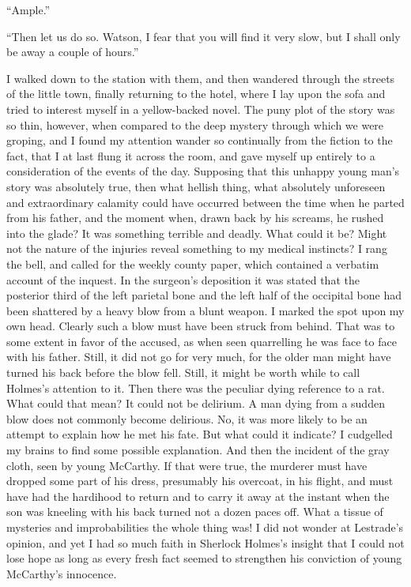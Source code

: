 “Ample.”

“Then let us do so. Watson, I fear that you will find it
very slow, but I shall only be away a couple of hours.”

I walked down to the station with them, and then wandered
through the streets of the little town, finally returning to the
hotel, where I lay upon the sofa and tried to interest myself in
a yellow-backed novel. The puny plot of the story was so thin,
however, when compared to the deep mystery through which
we were groping, and I found my attention wander so continually
from the fiction to the fact, that I at last flung it across
the room, and gave myself up entirely to a consideration of
the events of the day. Supposing that this unhappy young
man’s story was absolutely true, then what hellish thing, what
absolutely unforeseen and extraordinary calamity could have
occurred between the time when he parted from his father,
and the moment when, drawn back by his screams, he rushed
into the glade? It was something terrible and deadly. What
could it be? Might not the nature of the injuries reveal
something to my medical instincts? I rang the bell, and called
for the weekly county paper, which contained a verbatim account
of the inquest. In the surgeon’s deposition it was stated
that the posterior third of the left parietal bone and the
left half of the occipital bone had been shattered by a heavy
blow from a blunt weapon. I marked the spot upon my
own head. Clearly such a blow must have been struck from
behind. That was to some extent in favor of the accused, as
when seen quarrelling he was face to face with his father.
Still, it did not go for very much, for the older man might have
turned his back before the blow fell. Still, it might be worth
while to call Holmes’s attention to it. Then there was the
peculiar dying reference to a rat. What could that mean? It
could not be delirium. A man dying from a sudden blow
does not commonly become delirious. No, it was more likely
to be an attempt to explain how he met his fate. But what
could it indicate? I cudgelled my brains to find some possible
explanation. And then the incident of the gray cloth,
seen by young McCarthy. If that were true, the murderer
must have dropped some part of his dress, presumably his
overcoat, in his flight, and must have had the hardihood to
return and to carry it away at the instant when the son was
kneeling with his back turned not a dozen paces off. What a
tissue of mysteries and improbabilities the whole thing was!
I did not wonder at Lestrade’s opinion, and yet I had so much
faith in Sherlock Holmes’s insight that I could not lose hope
as long as every fresh fact seemed to strengthen his conviction
of young McCarthy’s innocence.

